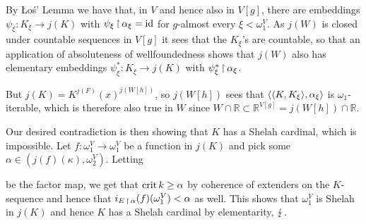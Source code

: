 \documentclass[../main]{subfiles}
\begin{document}
{{    By \L o\' s' Lemma we have that, in $V$ and hence also in $V[g]$, there are embeddings $\psi_\xi:K_\xi\to j(K)$ with $\psi_\xi\operatorname{\upharpoonright}\alpha_\xi=\operatorname{id}$ for $g$-almost every $\xi<\omega_1^V$. As $j(W)$ is closed under countable sequences in $V[g]$ it sees that the $K_\xi$'s are countable, so that an application of absoluteness of wellfoundedness  shows that $j(W)$ also has elementary embeddings $\psi^*_\xi:K_\xi\to j(K)$ with $\psi^*_\xi\operatorname{\upharpoonright}\alpha_\xi$.

    \qquad But $j(K)=K^{j(F)}(x)^{j(W[h])}$, so $j(W[h])$ sees that $\langle \langle K,K_\xi\rangle,\alpha_\xi\rangle$ is $\omega_1$-iterable, which is therefore also true in $W$ since $W\cap\mathbb R\subset\mathbb R^{V[g]}=j(W[h])\cap\mathbb R$.
  }

  Our desired contradiction is then showing that $K$ has a Shelah cardinal, which is impossible. Let $f:\omega_1^V\to\omega_1^V$ be a function in $j(K)$ and pick some $\alpha\in(j(f)(\kappa),\omega_2^V)$. Letting

  be the factor map, we get that $\operatorname{crit} k\geq\alpha$ by coherence of extenders on the $K$-sequence and hence that $i_{E\operatorname{\upharpoonright}\alpha}(f)(\omega_1^V)<\alpha$ as well. This shows that $\omega_1^V$ is Shelah in $j(K)$ and hence $K$ has a Shelah cardinal by elementarity, $\operatorname{\lightning}$.
}

\end{document}
